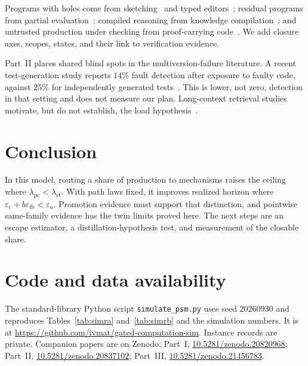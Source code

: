 \documentclass[11pt]{article}
\theoremstyle{definition}
\theoremstyle{remark}
\newcommand{\lst}{\lambda_{\mathrm{st}}}
\newcommand{\lpc}{\lambda_{\mathrm{pc}}}
\newcommand{\eop}{\varepsilon_{\mathrm{o}}}
\newcommand{\ecl}{\varepsilon_{\mathrm{c}}}
\begin{document}
Programs with holes come from sketching~\cite{solarlezama2008} and typed
editors~\cite{omar2017}; residual programs from partial evaluation~\cite{jones1993};
compiled reasoning from knowledge compilation~\cite{darwiche2002}; and untrusted production under
checking from proof-carrying code~\cite{necula1997}.
We add closure axes, scopes, states, and their link to verification evidence.

Part~II places shared blind spots in the multiversion-failure literature.
A recent test-generation study reports $14\%$ fault detection after exposure to faulty code,
against $25\%$ for independently generated tests~\cite{konstantinou2026risk}.
This is lower, not zero, detection in that setting and does not measure our plan.
Long-context retrieval studies motivate, but do not establish, the load
hypothesis~\cite{liu2023lost,modarressi2025nolima}.

\section{Conclusion}\label{sec:conclusion}
In this model, routing a share of production to mechanisms raises the ceiling where $\lpc<\lst$.
With path laws fixed, it improves realized horizon where
$\ecl+b\varepsilon_{\mathrm{fb}}<\eop$.
Promotion evidence must support that distinction, and pointwise same-family evidence has the
twin limits proved here. The next steps are an escape estimator, a distillation-hypothesis test,
and measurement of the closable share.

\section*{Code and data availability}
The standard-library Python script \texttt{simulate\_psm.py} uses seed $20260930$ and reproduces
Tables~\ref{tab:simra} and~\ref{tab:simrb} and the simulation numbers. It is at
\url{https://github.com/ivmat/gated-computation-sim}. Instance records are private.
Companion papers are on Zenodo:
Part~I, \href{https://doi.org/10.5281/zenodo.20820968}{10.5281/zenodo.20820968};
Part~II, \href{https://doi.org/10.5281/zenodo.20837102}{10.5281/zenodo.20837102};
Part~III, \href{https://doi.org/10.5281/zenodo.21456783}{10.5281/zenodo.21456783}.
\end{document}
